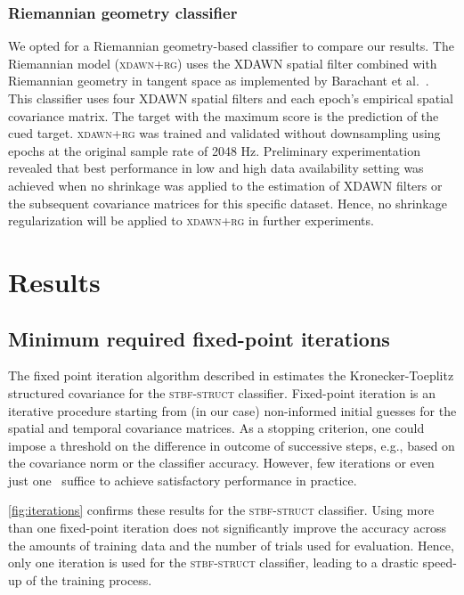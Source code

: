 	\subsubsection{Riemannian geometry classifier}
	\label{sec:riemannian}
	We opted for a Riemannian
	geometry-based classifier to compare our results.
	The Riemannian model (\textsc{xdawn+rg}) uses the XDAWN spatial filter combined
	with Riemannian geometry in tangent space as implemented by Barachant et
	al.~\cite{Barachant2014a}.
	This classifier uses four XDAWN spatial filters and each epoch's empirical spatial covariance matrix.
	The target with the maximum score is the prediction of the cued target.
	\textsc{xdawn+rg} was trained and validated without downsampling using epochs
	at the original sample rate of 2048 Hz.
  Preliminary experimentation revealed that best performance in low and high
  data availability setting was achieved when no shrinkage was applied to the estimation of XDAWN filters or the subsequent
  covariance matrices for this specific dataset.
  Hence, no shrinkage regularization will be applied to \textsc{xdawn+rg} in
  further experiments.

	\section{Results}
	\subsection{Minimum required fixed-point iterations}
	The fixed point iteration algorithm described
	in
  estimates the Kronecker-Toeplitz structured covariance for the
	\textsc{stbf-struct} classifier.
	Fixed-point iteration is an iterative procedure starting from (in our case)
	non-informed initial guesses for the spatial and temporal covariance matrices.
	As a stopping criterion, one could impose a threshold on the difference in
	outcome of successive steps, e.g., based on the covariance norm or the
	classifier accuracy.
	However, few iterations or even just one~\cite{Castaneda2014} suffice to achieve satisfactory performance in practice.

	\cref{fig:iterations} confirms these results for the \textsc{stbf-struct} classifier.
	Using more than one fixed-point iteration does not significantly improve the
	accuracy across the amounts of training data and the number of trials
  used for evaluation.
	Hence, only one iteration is used for the \textsc{stbf-struct} classifier, leading to a drastic speed-up of
  the  training process.


